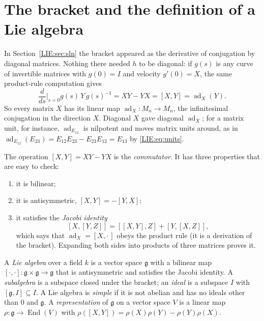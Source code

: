 \section{The bracket and the definition of a Lie algebra}
\label{LIE:sec:bracket}

In Section~\ref{LIE:sec:sln} the bracket appeared as the derivative of conjugation by diagonal
matrices. Nothing there needed $h$ to be diagonal: if $g(s)$ is any curve of invertible matrices with
$g(0)=I$ and velocity $g'(0)=X$, the same product-rule computation gives
\[
  \frac{d}{ds}\Big|_{s=0}g(s)\,Y\,g(s)^{-1}=XY-YX=[X,Y]=\operatorname{ad}_X(Y).
\]
So every matrix $X$ has its linear map $\operatorname{ad}_X\colon M_n\to M_n$, the infinitesimal
conjugation in the direction $X$. Diagonal $X$ gave diagonal $\operatorname{ad}_X$; for a matrix unit,
for instance, $\operatorname{ad}_{E_{12}}$ is nilpotent and moves matrix units around, as in
$\operatorname{ad}_{E_{12}}(E_{23})=E_{12}E_{23}-E_{23}E_{12}=E_{13}$ by \eqref{LIE:eq:units}.

The operation $[X,Y]=XY-YX$ is the \emph{commutator}. It has three properties that are easy to
check:
\begin{enumerate}[label=(\roman*)]
\item it is bilinear;
\item it is antisymmetric, $[X,Y]=-[Y,X]$;
\item it satisfies the \emph{Jacobi identity}
  \[
    [X,[Y,Z]]=[[X,Y],Z]+[Y,[X,Z]],
  \]
  which says that $\operatorname{ad}_X=[X,\cdot\,]$ obeys the product rule (it is a derivation of the
  bracket). Expanding both sides into products of three matrices proves it.
\end{enumerate}

\begin{definition}\label{LIE:def:liealg}
A \emph{Lie algebra} over a field $k$ is a vector space $\mathfrak g$ with a bilinear map
$[\cdot,\cdot]\colon\mathfrak g\times\mathfrak g\to\mathfrak g$ that is antisymmetric and satisfies the
Jacobi identity. A \emph{subalgebra} is a subspace closed under the bracket; an \emph{ideal} is a
subspace $I$ with $[\mathfrak g,I]\subseteq I$. A Lie algebra is \emph{simple} if it is not abelian and
has no ideals other than $0$ and $\mathfrak g$. A \emph{representation} of $\mathfrak g$ on a vector space
$V$ is a linear map $\rho\colon\mathfrak g\to\operatorname{End}(V)$ with
$\rho([X,Y])=\rho(X)\rho(Y)-\rho(Y)\rho(X)$.
\end{definition}

